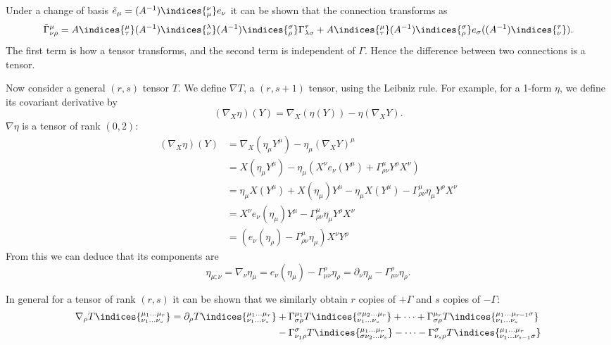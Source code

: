 \documentclass{jknotes}
\begin{document}
Under a change of basis \(\tilde{e}_\mu = (A^{-1})\indices{^\nu_\mu}e_\nu\) it can be shown that the connection transforms as
\begin{equation}
    \tilde\Gamma^\mu_{\nu\rho} = A\indices{^\mu_\tau}(A^{-1})\indices{^\lambda_\nu}(A^{-1})\indices{^\sigma_\rho}\Gamma^\tau_{\lambda\sigma} + A\indices{^\mu_\tau}(A^{-1})\indices{^\sigma_\rho}e_\sigma((A^{-1})\indices{^\tau_\nu}).
\end{equation}
The first term is how a tensor transforms, and the second term is independent of \(\Gamma\). Hence the difference between two connections is a tensor.

Now consider a general \((r,s)\) tensor \(T\). We define \(\nabla T\), a \((r,s+1)\) tensor, using the Leibniz rule. For example, for a 1-form \(\eta\), we define its covariant derivative by
\begin{equation}
    (\nabla_X\eta)(Y) = \nabla_X(\eta(Y)) - \eta(\nabla_X Y).
\end{equation}
\(\nabla\eta\) is a tensor of rank \((0,2)\):
\begin{align}
    (\nabla_X\eta)(Y) &= \nabla_X(\eta_\mu Y^\mu) - \eta_\mu (\nabla_X Y)^\mu \\
                      &= X(\eta_\mu Y^\mu) - \eta_\mu (X^\nu e_\nu (Y^\mu) + \Gamma^\mu_{\rho\nu} Y^\rho X^\nu) \\
                      &= \eta_\mu X(Y^\mu) + X(\eta_\mu)Y^\mu - \eta_\mu X(Y^\mu) - \Gamma^\mu_{\rho\nu}\eta_\mu Y^\rho X^\nu \\
                      &= X^\nu e_\nu(\eta_\mu) Y^\mu - \Gamma^\mu_{\rho\nu}\eta_\mu Y^\rho X^\nu \\
                      &= (e_\nu(\eta_\rho) - \Gamma^\mu_{\rho\nu}\eta_\mu)X^\nu Y^\rho
\end{align}
From this we can deduce that its components are
\begin{equation}
    \eta_{\mu;\nu} = \nabla_\nu\eta_\mu = e_\nu(\eta_\mu) - \Gamma^\rho_{\mu\nu}\eta_\rho = \partial_\nu\eta_\mu - \Gamma^\rho_{\mu\nu}\eta_\rho.
\end{equation}

In general for a tensor of rank \((r,s)\) it can be shown that we similarly obtain \(r\) copies of \(+\Gamma\) and \(s\) copies of \(-\Gamma\):
\begin{align}
    \nabla_\rho T\indices{^{\mu_1\dots\mu_r}_{\nu_1\dots\nu_s}} = \partial_\rho T\indices{^{\mu_1\dots\mu_r}_{\nu_1\dots\nu_s}}
    &+ \Gamma^{\mu_1}_{\sigma\rho}T\indices{^{\sigma\mu_2\dots\mu_r}_{\nu_1\dots\nu_s}}
     + \dots
     + \Gamma^{\mu_r}_{\sigma\rho}T\indices{^{\mu_1\dots\mu_{r-1}\sigma}_{\nu_1\dots\nu_s}} \\
    &- \Gamma^\sigma_{\nu_1\rho} T\indices{^{\mu_1\dots\mu_r}_{\sigma\nu_2\dots\nu_s}}
     - \dots
     - \Gamma^\sigma_{\nu_s\rho} T\indices{^{\mu_1\dots\mu_r}_{\nu_1\dots\nu_{s-1}\sigma}}
\end{align}
\end{document}
